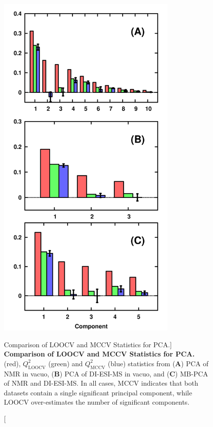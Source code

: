 \begin{figure}
\includegraphics[width=3.5in]{figs/apps/09-rqpca.png}
\caption
      [Comparison of LOOCV and MCCV \qsq{} Statistics for PCA.]{
  {\bf Comparison of LOOCV and MCCV \qsq{} Statistics for PCA.}
  \\
  \rsq{} (red), $Q^2_{\mathrm{LOOCV}}$ (green) and $Q^2_{\mathrm{MCCV}}$ (blue)
  statistics from ({\bf A}) PCA of \hnmr{} NMR in vacuo, ({\bf B}) PCA of
  DI-ESI-MS in vacuo, and ({\bf C}) MB-PCA of \hnmr{} NMR and DI-ESI-MS.
  In all cases, MCCV indicates that both datasets contain a single significant
  principal component, while LOOCV over-estimates the number of significant
  components.
}
\end{figure}

